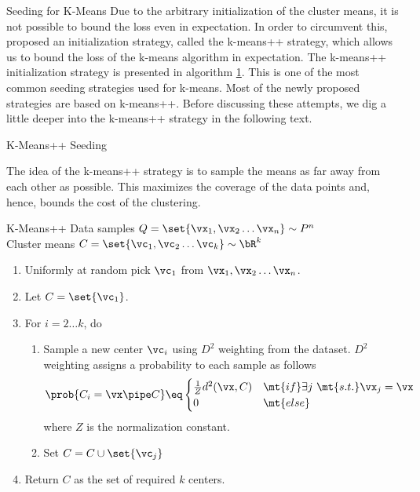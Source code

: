 \documentclass[10pt]{article}
\begin{document}
\begin{psection}{Seeding for K-Means}
    Due to the arbitrary initialization of the cluster means, it is not possible to
    bound the loss even in expectation. In order to circumvent this,~\cite{kmeanspp}
    proposed an initialization strategy, called the k-means++ strategy, which allows
    us to bound the loss of the k-means algorithm in expectation. The k-means++
    initialization strategy is presented in algorithm \hyperlink{algo:1}{1}. This is
    one of the most common seeding strategies used for k-means. Most of the newly
    proposed strategies are based on k-means++. Before discussing these attempts, we
    dig a little deeper into the k-means++ strategy in the following text.
    
    \begin{psubsection}{K-Means++ Seeding}
    
        The idea of the k-means++ strategy is to sample the means as far away from each
        other as possible. This maximizes the coverage of the data points and, hence,
        bounds the cost of the clustering.
    
        \begin{algo}{K-Means++}
             Data samples $Q = \set{\vx_1, \vx_2 \dots \vx_n} \sim P^n$ \\
             Cluster means $C = \set{\vc_1, \vc_2 \dots \vc_k} \sim \bR^k$
            \\[1em]
            \begin{enumerate}
                \item Uniformly at random pick $\vc_1$ from $\vx_1, \vx_2 \dots \vx_n$.
                \item Let $C = \set{\vc_1}$.
                \item For $i = 2 \dots k$, do
                    \begin{enumerate}
                        \item Sample a new center $\vc_i$ using $D^2$ weighting from the
                            dataset. $D^2$ weighting assigns a probability to each sample as
                            follows
                            \begin{align*}
                                \prob{C_i = \vx \pipe C} \eq \begin{cases}
                                    \frac{1}{Z} d^2(\vx, C) & \mt{if} \exists j\ \mt{s.t.} \vx_j = \vx \\
                                    0 & \mt{else}
                                \end{cases}
                            \end{align*}
                            where $Z$ is the normalization constant.
                        \item Set $C = C \cup \set{\vc_j}$
                    \end{enumerate}
                \item Return $C$ as the set of required $k$ centers.
            \end{enumerate}
        \end{algo}
    

\end{psubsection}
\end{psection}
\end{document}
